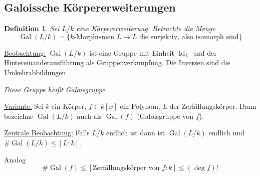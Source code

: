 \documentclass[a4paper,12pt,numbers=noenddot,parskip=full]{scrartcl}
\newcommand{\heading}{\underline}
\DeclareMathOperator{\Gal}{Gal}
\theoremstyle{dotless}
\newtheorem{definition}[theorem]{Definition}
\theoremstyle{remark}
\begin{document}
	\subsection{Galoissche Körpererweiterungen}
	
	\begin{definition}
		Sei $L/k$ eine Körpererweiterung. Betrachte die Menge
		\begin{equation*}
			\Gal(L/k) = \{ \text{$k$-Morphismen $L \to L$ die surjektiv, also isomorph sind} \}
		\end{equation*}
	\end{definition}

	\heading{Beobachtung:} $\Gal(L/k)$ ist eine Gruppe mit Einheit $\operatorname{Id}_L$ und der Hintereinanderausführung als Gruppenverknüpfung. Die Inversen sind die Umkehrabbildungen.
	
	\textit{Diese Gruppe heißt Galoisgruppe}
	
	\heading{Variante:} Sei $k$ ein Körper, $f \in k[x]$ ein Polynom, $L$ der Zerfällungskörper. Dann bezeichne $\Gal(L/k)$ auch als $\Gal(f)$ (Galoisgruppe von $f$).
	
	\heading{Zentrale Beobachtung:} Falls $L/k$ endlich ist dann ist $\Gal(L/k)$ endlich und $\#\Gal(L/k) \leq [L: k]$.
	
	Analog
	\begin{equation*}
		\#\Gal(f) \leq [ \text{Zerfällungskörper von $f$}: k ] \leq (\deg f)!
	\end{equation*}
	
\end{document}
